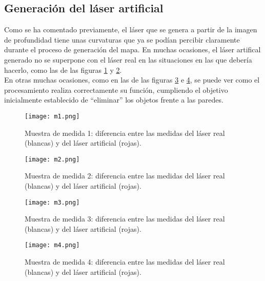 \subsection{Generación del láser artificial}

Como se ha comentado previamente, el láser que se genera a partir de la imagen de profundidad tiene unas curvaturas que ya se podían percibir claramente durante el proceso de generación del mapa. En muchas ocasiones, el láser artifical generado no se superpone con el láser real en las situaciones en las que debería hacerlo, como las de las figuras \ref{fig:m1} y \ref{fig:m2}.\\

En otras muchas ocasiones, como en las de las figuras \ref{fig:m3} e \ref{fig:m4}, se puede ver como el procesamiento realiza correctamente su función, cumpliendo el objetivo inicialmente establecido de ``eliminar'' los objetos frente a las paredes.\\

\begin{figure}[H]
	\begin{center} 
		\texttt{[image: m1.png]}
	\end{center}
	\caption{Muestra de medida 1: diferencia entre las medidas del láser real (blancas) y del láser artificial (rojas).}
	\label{fig:m1}
\end{figure}

\begin{figure}[H]
	\begin{center} 
		\texttt{[image: m2.png]}
	\end{center}
	\caption{Muestra de medida 2: diferencia entre las medidas del láser real (blancas) y del láser artificial (rojas).}
	\label{fig:m2}
\end{figure}

\begin{figure}[H]
	\begin{center} 
		\texttt{[image: m3.png]}
	\end{center}
	\caption{Muestra de medida 3: diferencia entre las medidas del láser real (blancas) y del láser artificial (rojas).}
	\label{fig:m3}
\end{figure}

\begin{figure}[H]
	\begin{center} 
		\texttt{[image: m4.png]}
	\end{center}
	\caption{Muestra de medida 4: diferencia entre las medidas del láser real (blancas) y del láser artificial (rojas).}
	\label{fig:m4}
\end{figure}


